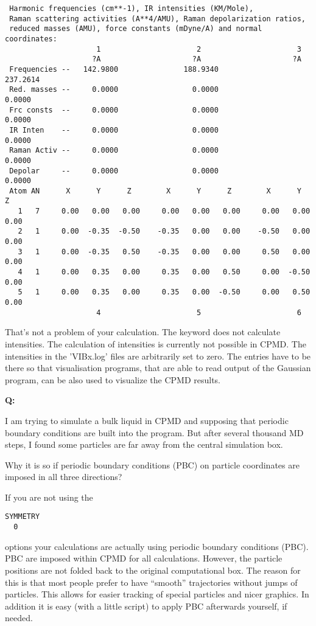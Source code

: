 \documentclass[twoside,10pt,titlepage,a4paper]{article}
\newcommand{\reflabel}[1]{\hypertarget{#1}}
\newcommand{\reflabel}[1]{\label{#1}}
\newcommand{\faqquestion}[1]{\vspace{2ex}\reflabel{faq#1}{{\bf Q:\ }}}
\newcommand{\faqanswer}{\vspace{1ex}{{\bf A:\ }}}
\begin{document}
\begin{verbatim}
 Harmonic frequencies (cm**-1), IR intensities (KM/Mole),
 Raman scattering activities (A**4/AMU), Raman depolarization ratios,
 reduced masses (AMU), force constants (mDyne/A) and normal coordinates:
                     1                      2                      3
                    ?A                     ?A                     ?A
 Frequencies --   142.9800               188.9340               237.2614
 Red. masses --     0.0000                 0.0000                 0.0000
 Frc consts  --     0.0000                 0.0000                 0.0000
 IR Inten    --     0.0000                 0.0000                 0.0000
 Raman Activ --     0.0000                 0.0000                 0.0000
 Depolar     --     0.0000                 0.0000                 0.0000
 Atom AN      X      Y      Z        X      Y      Z        X      Y      Z
   1   7     0.00   0.00   0.00     0.00   0.00   0.00     0.00   0.00   0.00
   2   1     0.00  -0.35  -0.50    -0.35   0.00   0.00    -0.50   0.00   0.00
   3   1     0.00  -0.35   0.50    -0.35   0.00   0.00     0.50   0.00   0.00
   4   1     0.00   0.35   0.00     0.35   0.00   0.50     0.00  -0.50   0.00
   5   1     0.00   0.35   0.00     0.35   0.00  -0.50     0.00   0.50   0.00
                     4                      5                      6
\end{verbatim}

\faqanswer
That's not a problem of your calculation. The keyword
 does not calculate intensities.
The calculation of intensities is currently not possible in CPMD.
The intensities in the 'VIBx.log' files are arbitrarily set to zero.
The entries have to be there so that visualisation programs, that are
able to read output of the Gaussian program, can be also used to
visualize the CPMD results.
%

\faqquestion{liquidpbcs}
I am trying to simulate a bulk liquid in
CPMD and supposing that periodic
boundary conditions are built into the program.
But after several thousand MD steps, I found some
particles are far away from the central simulation box.

Why it is so if periodic boundary conditions (PBC) on
particle coordinates are imposed in all three
directions?

\faqanswer
If you are not using the
\begin{verbatim}
SYMMETRY
  0
\end{verbatim}
options your calculations are actually using periodic boundary
conditions (PBC). PBC are imposed within CPMD for
all calculations. However, the particle positions
are not folded back to the original computational
box. The reason for this is that most people prefer
to have ``smooth'' trajectories without jumps of
particles. This allows for easier tracking of
special particles and nicer graphics. In addition
it is easy (with a little script) to apply PBC
afterwards yourself, if needed.
%
\end{document}
